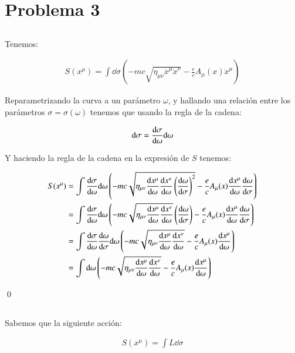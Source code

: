 \section{Problema 3}
\subsection{}

Tenemos:

\begin{align*}
    S(x^\mu)=\int \dd \sigma\left(-mc\sqrt{\eta_{\mu\nu}\dot{x}^\mu\dot{x}^\nu}-\frac{e}{c}A_\mu(x)\dot{x}^\mu\right)
\end{align*}

Reparametrizando la curva a un parámetro $\omega$, y hallando una relación entre los parámetros $\sigma=\sigma(\omega)$ tenemos que usando la regla de la cadena:

\begin{align*}
    \dd\sigma=\dv{\sigma}{\omega}\dd\omega
\end{align*}

Y haciendo la regla de la cadena en la expresión de $S$ tenemos:

\begin{align*}
    S(x^\mu)
    &=\int\dv{\sigma}{\omega} \dd \omega\left(-mc\sqrt{\eta_{\mu\nu}\dv{x^\mu}{\omega}\dv{x^\nu}{\omega}\left(\dv{\omega}{\sigma}\right)^2}-\frac{e}{c}A_\mu(x)\dv{x^\mu}{\omega}\dv{\omega}{\sigma}\right)\\
    &=\int\dv{\sigma}{\omega} \dd \omega\left(-mc\sqrt{\eta_{\mu\nu}\dv{x^\mu}{\omega}\dv{x^\nu}{\omega}}\left(\dv{\omega}{\sigma}\right)-\frac{e}{c}A_\mu(x)\dv{x^\mu}{\omega}\dv{\omega}{\sigma}\right)\\
    &=\int\dv{\sigma}{\omega}\dv{\omega}{\sigma} \dd \omega\left(-mc\sqrt{\eta_{\mu\nu}\dv{x^\mu}{\omega}\dv{x^\nu}{\omega}}-\frac{e}{c}A_\mu(x)\dv{x^\mu}{\omega}\right)\\    
    &=\int\dd \omega\left(-mc\sqrt{\eta_{\mu\nu}\dv{x^\mu}{\omega}\dv{x^\nu}{\omega}}-\frac{e}{c}A_\mu(x)\dv{x^\mu}{\omega}\right)\\    
\end{align*}

\qed

\subsection{}

Sabemos que la siguiente acción:

\begin{align*}
    S(x^\mu)=\int L\dd \sigma
\end{align*}

